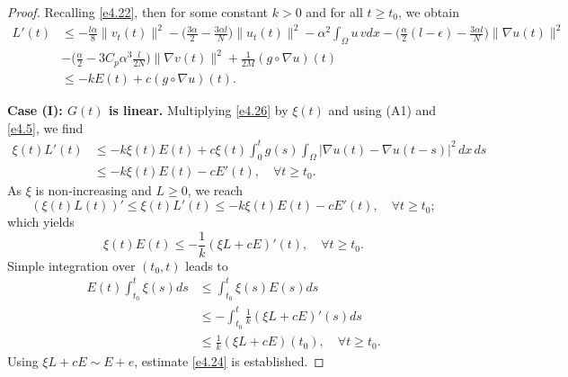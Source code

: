 \begin{proof}
Recalling \eqref{e4.22}, then for some constant $k > 0$ and for all $t \geq t_0$,
we obtain
\begin{equation}
\begin{aligned}
L'(t) &\leq - \frac{l\alpha}{8} \| v_t(t) \|^2
 - \Big( \frac{3 \alpha}{2}- \frac{3\alpha l}{N}\Big) \| u_t(t) \|^2
  - \alpha^2 \int_{\Omega} u \, v dx
 - \Big( \frac{\alpha}{2} (l- \epsilon)- \frac{3\alpha l}{N} \Big) \| \nabla u(t) \|^2\\
&- \Big( \frac{\alpha}{2} - 3 C_p \alpha^{3} \frac{l}{2N} \Big)
 \| \nabla v (t)\|^2 +\frac{1}{2M} (g \circ \nabla u)(t)\\
& \leq -k E(t) + c (g \circ \nabla u)(t).
\end{aligned} \label{e4.26}
\end{equation}
\smallskip

\noindent\textbf{Case (I): $G(t)$ is linear.}
Multiplying \eqref{e4.26} by $\xi(t)$ and using (A1) and \eqref{e4.5},
we find
\begin{align*}
\xi(t) L'(t)
&\leq -k \xi(t) E(t) + c \xi(t) \int_0^{t} g(s)
 \int_{\Omega} |\nabla u(t) - \nabla u(t - s)|^2 \, dx \, ds\\
& \leq -k \xi(t) E (t) - c E'(t),\quad \forall t\geq t_0.
\end{align*}
As $\xi$ is non-increasing and $L \geq 0$, we reach
\[
(\xi(t)L(t))'\leq \xi(t)L'(t)\leq - k \xi(t) E(t) - c E'(t),\quad \forall t\geq t_0;
\]
which yields
\[
\xi(t) E(t)\leq -\frac{1}{k}(\xi L+c E)'(t),\quad \forall t\geq t_0.
\]
Simple integration over $(t_0, t)$ leads to
\begin{align*}
E(t) \int_{t_0}^t\xi(s)ds
&\leq \int_{t_0}^t \xi(s) E(s)ds \\
&\leq -\int_{t_0}^t \frac{1}{k}(\xi L+c E)'(s)ds \\
& \leq \frac{1}{k}(\xi L+c E)(t_0),\quad \forall t\geq t_0.
\end{align*}
Using $\xi L+c E \sim E+e$, estimate \eqref{e4.24} is established.
\smallskip


\end{proof}
